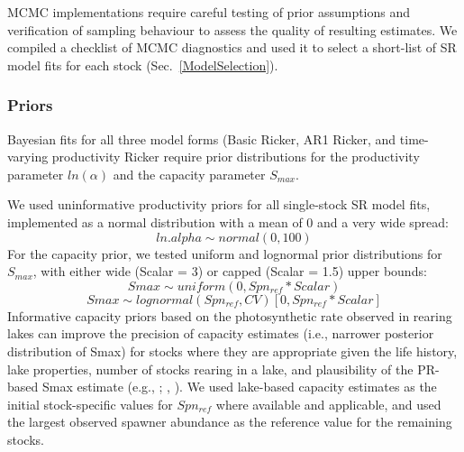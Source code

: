 \documentclass[french,11pt]{book}
\begin{document}
MCMC implementations require careful testing of prior assumptions and verification of sampling behaviour to assess the quality of resulting estimates. We compiled a checklist of MCMC diagnostics and used it to select a short-list of SR model fits for each stock (Sec.~\ref{ModelSelection}).

\subsubsection{Priors}\label{Priors}

Bayesian fits for all three model forms (Basic Ricker, AR1 Ricker, and time-varying productivity Ricker require prior distributions for the productivity parameter \(ln(\alpha)\) and the capacity parameter \(S_{max}\).

We used uninformative productivity priors for all single-stock SR model fits, implemented as a normal distribution with a mean of 0 and a very wide spread:
\begin{equation} 
  ln.alpha \sim normal(0,100)
  \label{eq:ProductivityPrior}
\end{equation}
For the capacity prior, we tested uniform and lognormal prior distributions for \(S_{max}\), with either wide (Scalar = 3) or capped (Scalar = 1.5) upper bounds:
\begin{equation} 
  Smax \sim uniform(0,Spn_{ref}*Scalar)
  \label{eq:UniformCapacityPrior}
\end{equation}
\begin{equation} 
  Smax \sim lognormal(Spn_{ref},CV) [0,Spn_{ref} * Scalar]
  \label{eq:LognormalCapacityPrior}
\end{equation}
Informative capacity priors based on the photosynthetic rate observed in rearing lakes can improve the precision of capacity estimates (i.e., narrower posterior distribution of Smax) for stocks where they are appropriate given the life history, lake properties, number of stocks rearing in a lake, and plausibility of the PR-based Smax estimate (e.g., ; , ). We used lake-based capacity estimates as the initial stock-specific values for \(Spn_{ref}\) where available and applicable, and used the largest observed spawner abundance as the reference value for the remaining stocks.

\clearpage
\end{document}
